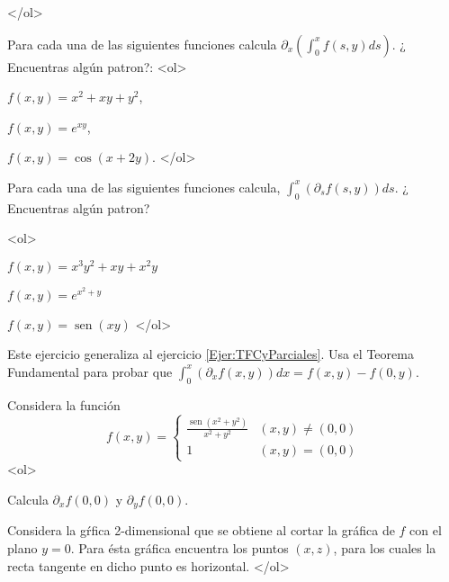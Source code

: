 \documentclass{article}
\theoremstyle{definition}
\newcommand{\sen}{\operatorname{sen}}
\begin{document}
       </ol>


              
     \item Para cada una de las siguientes funciones calcula $\partial_x\left( \int_0^x f(s,y)ds \right)$. ¿ Encuentras algún patron?:
       <ol>
       \item $f(x,y)=x^2+xy+y^2$,
       \item $f(x,y)=e^{xy}$,
       \item $f(x,y)=\cos(x+2y)$.
       </ol>
       
     \item\label{Ejer:TFCyParciales} Para cada una de las siguientes funciones calcula,  $\int_0^x(\partial_s f(s,y))ds$.
      ¿ Encuentras algún patron?

       <ol>
       \item $f(x,y)=x^3y^2+xy+x^2y$
       \item $f(x,y)=e^{x^2+y}$
       \item $f(x,y)=\sen(xy)$
       </ol>

       
      
     \item Este ejercicio generaliza al ejercicio \ref{Ejer:TFCyParciales}. Usa el Teorema Fundamental para probar
       que $\int_0^x(\partial_x f(x,y))dx=f(x,y)-f(0,y)$.
      
       
       

   
     \item Considera la función
       $$
       f(x,y)=\left\{
         \begin{array}{cc}
           \frac{\sen(x^2+y^2)}{x^2+y^2} & (x,y)\ne (0,0) \\
           1 & (x,y)=(0,0)
         \end{array}
         \right.
         $$
         <ol>
         \item Calcula $\partial_xf(0,0)$ y $\partial_yf(0,0)$.
         \item Considera la g\'rfica 2-dimensional que se obtiene al cortar
           la gráfica de $f$ con el plano $y=0$. Para ésta gráfica encuentra
           los puntos $(x,z)$,  para los cuales la recta tangente en dicho punto es horizontal.
         </ol>    
   
\end{document}
